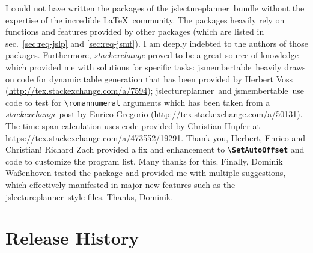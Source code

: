 \documentclass[english]{article}
\newcommand*\jmacro[1]{\textbf{\texttt{#1}}}
\newcommand*\jcsmacro[1]{\jmacro{\textbackslash{#1}}}
\newcommand*\jfmacro[1]{\texttt{#1}}
\newcommand*\jfcsmacro[1]{\jfmacro{\textbackslash{#1}}}
\newcommand*\jslp{\textsf{jslectureplanner}}
\newcommand*\jsmt{\textsf{jsmembertable}}
\begin{document}
I could not have written the packages of the \jslp\ bundle without the expertise of the incredible \LaTeX\
community. The packages heavily rely on functions and features
provided by other packages (which are listed in sec.~\ref{sec:req-jslp} and \ref{sec:req-jsmt}).
I am deeply indebted to the authors of those packages.
Furthermore, \emph{stackexchange} proved to be a great source of knowledge which
provided me with solutions for specific tasks:
\jsmt\ heavily draws on code for dynamic table generation that has been
provided by Herbert Voss (\url{http://tex.stackexchange.com/a/7594}); \jslp\ and \jsmt\
use code to test for \jfcsmacro{romannumeral} arguments which has been taken from
a \emph{stackexchange} post by Enrico Gregorio (\url{http://tex.stackexchange.com/a/50131}).
The time span calculation uses code provided by Christian Hupfer at
\url{https://tex.stackexchange.com/a/473552/19291}.
Thank you, Herbert, Enrico and Christian!
Richard Zach provided a fix and enhancement to \jcsmacro{SetAutoOffset} and code to customize
the program list. Many thanks for this.
Finally, Dominik Waßenhoven tested the package and provided
me with multiple suggestions, which effectively manifested in major new features such as
the \jslp\ style files. Thanks, Dominik.

\section{Release History}
\end{document}
